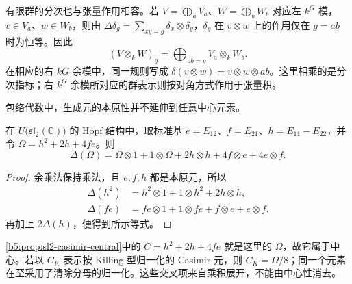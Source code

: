 \ProseParagraphBreak
有限群的分次也与张量作用相容。若 \(V=\bigoplus_aV_a\)、\(W=\bigoplus_bW_b\) 对应左 \(k^G\) 模，\(v\in V_a\)、\(w\in W_b\)，则由 \(\Delta\delta_g=\sum_{xy=g}\delta_x\otimes\delta_y\)，\(\delta_g\) 在 \(v\otimes w\) 上的作用仅在 \(g=ab\) 时为恒等。因此
\[
	(V\otimes_kW)_g=\bigoplus_{ab=g}V_a\otimes_kW_b.
\]
在相应的右 \(kG\) 余模中，同一规则写成 \(\delta(v\otimes w)=v\otimes w\otimes ab\)。这里相乘的是分次指标；右 \(k^G\) 余模所对应的群表示则按对角方式作用于张量积。

\ProseParagraphBreak
包络代数中，生成元的本原性并不延伸到任意中心元素。
\begin{proposition}\label{b5:prop:casimir-coproduct}
	在 \(U\bigl(\mathfrak{sl}_2(\mathbb C)\bigr)\) 的 Hopf 结构中，取标准基 \(e=E_{12}\)、\(f=E_{21}\)、\(h=E_{11}-E_{22}\)，并令 \(\Omega=h^2+2h+4fe\)。则
	\[
		\Delta(\Omega)=\Omega\otimes1+1\otimes\Omega +2h\otimes h+4f\otimes e+4e\otimes f.
	\]
\end{proposition}
\begin{proof}
	余乘法保持乘法，且 \(e,f,h\) 都是本原元，所以
	\[
		\begin{aligned}
			\Delta(h^2)&=h^2\otimes1+1\otimes h^2+2h\otimes h,\\
			\Delta(fe)&=fe\otimes1+1\otimes fe+f\otimes e+e\otimes f.
		\end{aligned}
	\]
	再加上 \(2\Delta(h)\)，便得到所示等式。
\end{proof}
\cref{b5:prop:sl2-casimir-central}中的 \(C=h^2+2h+4fe\) 就是这里的 \(\Omega\)，故它属于中心。若以 \(C_K\) 表示按 Killing 型归一化的 Casimir 元，则 \(C_K=\Omega/8\)；同一个元素在至采用了清除分母的归一化。这些交叉项来自乘积展开，不能由中心性消去。

